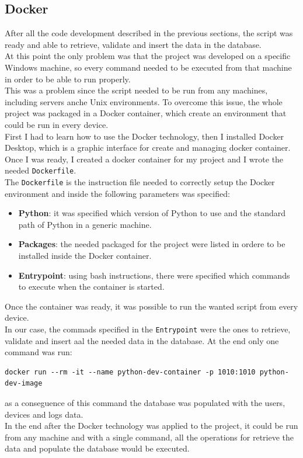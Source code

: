 \documentclass[12pt, a4paper, oneside]{article}
\begin{document}
\subsection{Docker}
After all the code development described in the previous sections, the script was ready and able to retrieve, validate and insert the data in the database.\\
At this point the only problem was that the project was developed on a specific Windows machine, so every command needed to be executed from that machine in order to be able to run properly.\\
This was a problem since the script needed to be run from any machines, including servers anche Unix environments. To overcome this issue, the whole project was packaged in a Docker container, which
create an environment that could be run in every device.\\
First I had to learn how to use the Docker technology, then I installed Docker Desktop, which is a graphic interface for create and managing docker container. Once I was ready, I created a docker container for
my project and I wrote the needed \texttt{Dockerfile}. \\
The \texttt{Dockerfile} is the instruction file needed to correctly setup the Docker environment and inside the following parameters was specified:
\begin{itemize}
    \item \textbf{Python}: it was specified which version of Python to use and the standard path of Python in a generic machine.
    \item \textbf{Packages}: the needed packaged for the project were listed in ordere to be installed inside the Docker container.
    \item \textbf{Entrypoint}: using bash instructions, there were specified which commands to execute when the container is started.
\end{itemize}
Once the container was ready, it was possible to run the wanted script from every device.\\
In our case, the commads specified in the \texttt{Entrypoint} were the ones to retrieve, validate and insert aal the needed data in the database. At the end only one command was run:
\begin{center}
\scriptsize
\begin{BVerbatim}
docker run --rm -it --name python-dev-container -p 1010:1010 python-dev-image  
\end{BVerbatim}
\end{center}
as a conseguence of this command the database was populated with the users, devices and logs data.\\
In the end after the Docker technology was applied to the project, it could be run from any machine and with a single command, all the operations for retrieve the data and populate the database would be executed. 
\end{document}
